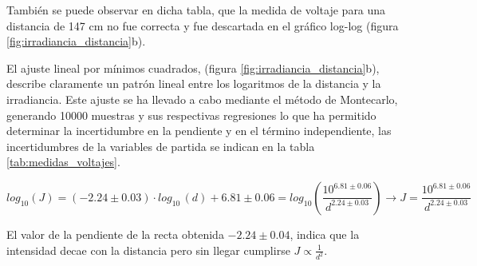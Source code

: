 \vspace{\baselineskip}

También se puede observar en dicha tabla, que la medida de voltaje para una distancia de 147 cm no fue correcta y fue descartada en el gráfico log-log (figura \ref{fig:irradiancia_distancia}b). 

\vspace{\baselineskip}

El ajuste lineal por mínimos cuadrados, (figura \ref{fig:irradiancia_distancia}b),  describe claramente un patrón lineal entre los logaritmos de la distancia y la irradiancia. Este ajuste se ha llevado a cabo mediante el método de Montecarlo, generando 10000 muestras y sus respectivas regresiones lo que ha permitido determinar la incertidumbre en la pendiente y en el término independiente, las incertidumbres de la variables de partida se indican en la tabla \ref{tab:medidas_voltajes}.



\begin{equation}\label{eq:ajuste_logJ}
		log_{10}(J) = (-2.24\pm 0.03)\cdot log_{10}\,(d) + 6.81\pm 0.06 = log_{10}(\frac{10^{6.81\pm0.06}}{d^{2.24\pm 0.03}} ) \rightarrow \boxed{J = \frac{10^{6.81\pm 0.06}}{d^{2.24\pm 0.03}}}
\end{equation}

\vspace{\baselineskip}

El valor de la pendiente de la recta obtenida $-2.24\pm 0.04$, indica que la intensidad decae con la distancia pero sin llegar cumplirse $J \propto \frac{1}{d^2}$.


